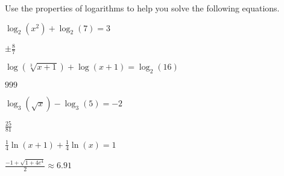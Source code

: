 \begin{exercises}
\begin{problem}
Use the properties of logarithms to help you solve the following 
equations.
\begin{multicols}{2}
	\begin{subproblem}
		$\log_2(x^2)+\log_2(7)=3$ 
		\begin{shortsolution}
			$\pm\frac{8}{7}$
		\end{shortsolution}
	\end{subproblem}
	\begin{subproblem}
		$\log(\sqrt[3]{x+1})+\log(x+1)=\log_2(16)$ 
		\begin{shortsolution}
			$999$
		\end{shortsolution}
	\end{subproblem}
	\begin{subproblem}
		$\log_3(\sqrt{x})-\log_3(5)=-2$ 
		\begin{shortsolution}
			$\frac{25}{81}$
		\end{shortsolution}
	\end{subproblem}
	\begin{subproblem}
		$\frac{1}{4}\ln(x+1) +\frac{1}{4}\ln(x)=1$
		\begin{shortsolution}
			$\frac{-1+\sqrt{1+4e^4}}{2}\approx 6.91$
		\end{shortsolution}
	\end{subproblem}
\end{multicols}
\end{problem}


\end{exercises}
